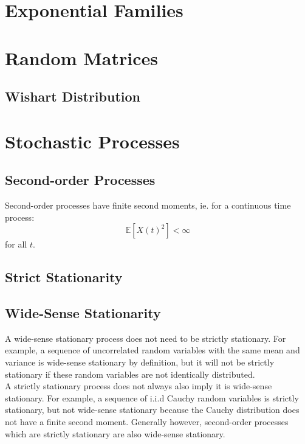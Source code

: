 \documentclass[11pt]{report} %
\begin{document}
\section{Exponential Families}

\section{Random Matrices}

\subsection{Wishart Distribution}

\section{Stochastic Processes}

\subsection{Second-order Processes}

Second-order processes have finite second moments, ie. for a continuous time process:
\begin{equation}
\mathbb{E}\left[X\left(t\right)^{2}\right] < \infty
\end{equation}
for all $t$.

\subsection{Strict Stationarity}

\subsection{Wide-Sense Stationarity}

A wide-sense stationary process does not need to be strictly stationary. For example, a sequence of uncorrelated random variables with the same mean and variance is wide-sense stationary by definition, but it will not be strictly stationary if these random variables are not identically distributed. \\

A strictly stationary process does not always also imply it is wide-sense stationary. For example, a sequence of i.i.d Cauchy random variables is strictly stationary, but not wide-sense stationary because the Cauchy distribution does not have a finite second moment. Generally however, second-order processes which are strictly stationary are also wide-sense stationary.
\end{document}
